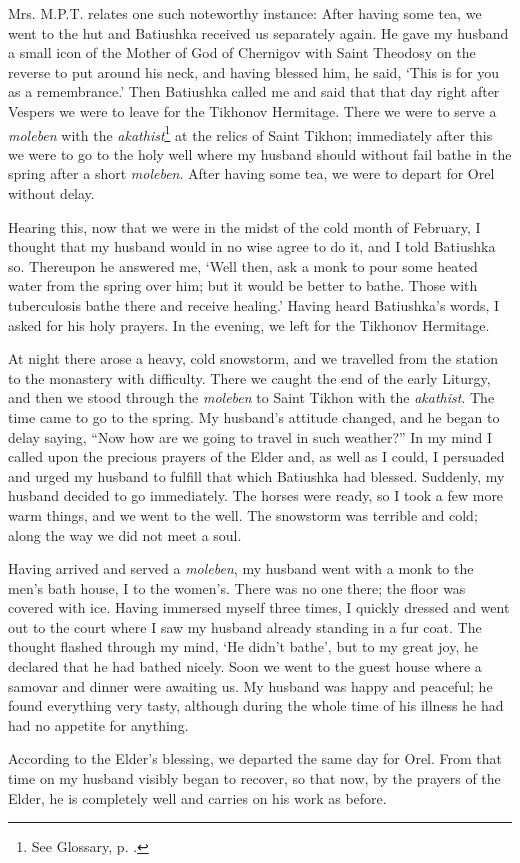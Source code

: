 \begin{longquote}{Mrs. M.P.T. relates one such noteworthy instance:}
After having some tea, we went to the hut and Batiushka received us separately again. He gave my husband a small icon of the Mother of God of Chernigov with Saint Theodosy on the reverse to put around his neck, and having blessed him, he said, `This is for you as a remembrance.' Then Batiushka called me and said that that day right after Vespers we were to leave for the Tikhonov Hermitage. There we were to serve a \textit{moleben} with the \textit{akathist}\footnote{See Glossary, p. \pageref{akathist}.} at the relics of Saint Tikhon; immediately after this we were to go to the holy well where my husband should without fail bathe in the spring after a short \textit{moleben}. After having some tea, we were to depart for Orel without delay.

Hearing this, now that we were in the midst of the cold month of February, I thought that my husband would in no wise agree to do it, and I told Batiushka so. Thereupon he answered me, `Well then, ask a monk to pour some heated water from the spring over him; but it would be better to bathe. Those with tuberculosis bathe there and receive healing.' Having heard Batiushka's words, I asked for his holy prayers. In the evening, we left for the Tikhonov Hermitage.

At night there arose a heavy, cold snowstorm, and we travelled from the station to the monastery with difficulty. There we caught the end of the early Liturgy, and then we stood through the \textit{moleben} to Saint Tikhon with the \textit{akathist}. The time came to go to the spring. My husband's attitude changed, and he began to delay saying, ``Now how are we going to travel in such weather?'' In my mind I called upon the precious prayers of the Elder and, as well as I could, I persuaded and urged my husband to fulfill that which Batiushka had blessed. Suddenly, my husband decided to go immediately. The horses were ready, so I took a few more warm things, and we went to the well. The snowstorm was terrible and cold; along the way we did not meet a soul.

Having arrived and served a \textit{moleben}, my husband went with a monk to the men's bath house, I to the women's. There was no one there; the floor was covered with ice. Having immersed myself three times, I quickly dressed and went out to the court where I saw my husband already standing in a fur coat. The thought flashed through my mind, `He didn't bathe', but to my great joy, he declared that he had bathed nicely. Soon we went to the guest house where a samovar and dinner were awaiting us. My husband was happy and peaceful; he found everything very tasty, although during the whole time of his illness he had had no appetite for anything.

According to the Elder's blessing, we departed the same day for Orel. From that time on my husband visibly began to recover, so that now, by the prayers of the Elder, he is completely well and carries on his work as before.
\end{longquote}

